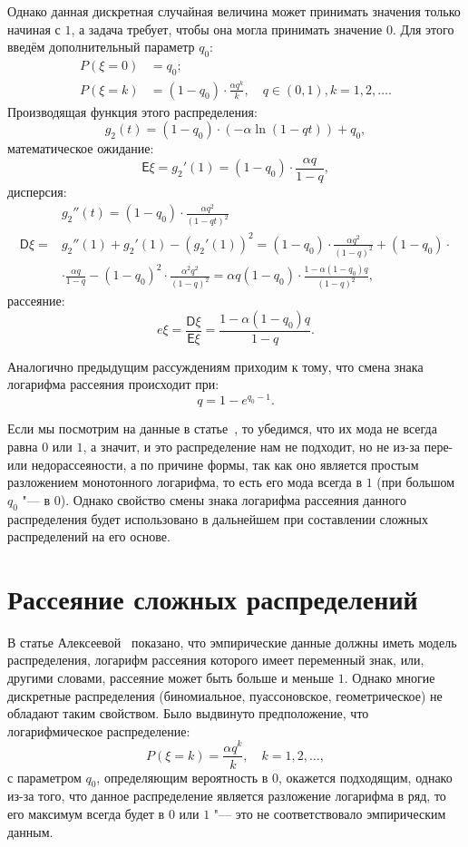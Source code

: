 \documentclass[12pt, specialist, subf, substylefile = spbu.rtx]{disser}
\begin{document}
	Однако данная дискретная случайная величина может принимать значения только начиная с $ 1 $, а задача требует, чтобы она могла принимать значение $ 0 $. Для этого введём дополнительный параметр $ q _0 $:
	\[
		\begin{aligned}
			P(\xi = 0) &= q _0;\\
			P(\xi = k) &= (1 - q _0) \cdot \frac {\alpha q ^k} {k},\quad q \in (0, 1), k = 1, 2, \dots.
		\end{aligned}
	\]
	Производящая функция этого распределения:
	\[
		g _2(t) = (1 - q _0) \cdot (- \alpha \ln (1 - qt)) + q _0,
	\]
	математическое ожидание:
	\[
		\mathsf{E} \xi = g _2' (1) = (1 - q _0) \cdot \frac {\alpha q} {1 - q},
	\]
	дисперсия:
	\[
		\begin{aligned}
			&g _2'' (t) = (1 - q _0) \cdot \frac {\alpha q ^2} {(1 - qt) ^2}\\
			\mathsf{D} \xi = &g _2''(1) + g _2'(1) - \left( g _2' (1) 	\right) ^2 = (1 - q _0) \cdot \frac {\alpha q ^2} {(1 - q) ^2} + (1 - q _0) \cdot\\
			&\cdot \frac {\alpha q} {1 - q} - (1 - q _0) ^2 \cdot \frac {\alpha ^2 q ^2} {(1 - q) ^2} = \alpha q (1 - q _0) \cdot \frac {1 - \alpha (1 - q _0)q} {(1 - q) ^2},
		\end{aligned}
	\]
	рассеяние:
	\[
		e\xi = \frac {\mathsf{D} \xi} {\mathsf{E} \xi} = \frac {1 - \alpha (1 - q _0)q} {1 - q}.
	\]
	
	Аналогично предыдущим рассуждениям приходим к тому, что смена знака логарифма рассеяния происходит при:
	\[ 
		q = 1 - e ^{q _0 - 1}.
	\]
	
	Если мы посмотрим на данные в статье~\cite{bib:alexeeva2008}, то убедимся, что их мода не всегда равна $ 0 $ или $ 1 $, а значит, и это распределение нам не подходит, но не из-за пере- или недорассеяности, а по причине формы, так как оно является простым разложением монотонного логарифма, то есть его мода всегда в $ 1 $ (при большом $ q _0 $ "--- в $ 0 $). Однако свойство смены знака логарифма рассеяния данного распределения будет использовано в дальнейшем при составлении сложных распределений на его основе.
	
	\section{Рассеяние сложных распределений}
	
	В статье Алексеевой~\cite{bib:alexeeva2008} показано, что эмпирические данные должны иметь модель распределения, логарифм рассеяния которого имеет переменный знак, или, другими словами, рассеяние может быть больше и меньше $ 1 $. Однако многие дискретные распределения (биномиальное, пуассоновское, геометрическое) не обладают таким свойством. Было выдвинуто предположение, что логарифмическое распределение:
	\[
		P(\xi = k) = \frac {\alpha q ^k} {k},\quad k = 1, 2, \dots,
	\]
	с параметром $ q _0 $, определяющим вероятность в $ 0 $, окажется подходящим, однако из-за того, что данное распределение является разложение логарифма в ряд, то его максимум всегда будет в $ 0 $ или $ 1 $ "--- это не соответствовало эмпирическим данным.
	
\end{document}
